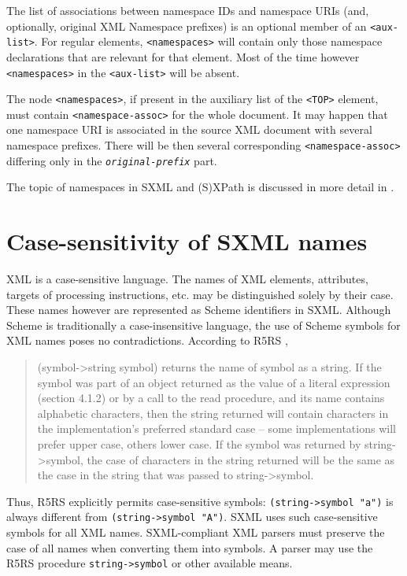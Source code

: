 \documentclass[10pt]{article}
\begin{document}
The list of associations between namespace IDs and namespace URIs (and, optionally, original XML Namespace prefixes) is an optional member of an \texttt{<aux-list>}. For regular elements, \texttt{<namespaces>} will contain only those namespace declarations that are relevant for that element. Most of the time however \texttt{<namespaces>} in the \texttt{<aux-list>} will be absent.

The node \texttt{<namespaces>}, if present in the auxiliary list of the \texttt{<TOP>} element, must contain \texttt{<namespace-assoc>} for the whole document. It may happen that one
namespace URI is associated in the source XML document with several
namespace prefixes. There will be then several corresponding \texttt{<namespace-assoc>} differing only in the \texttt{{\itshape original-prefix}} part.

The topic of namespaces in SXML and (S)XPath is discussed in
more detail in \cite{SXML-NS}.

\section{Case-sensitivity of SXML names}
XML is a case-sensitive language. The names of XML elements,
attributes, targets of processing instructions, etc. may be
distinguished solely by their case. These names however are
represented as Scheme identifiers in SXML. Although Scheme is
traditionally a case-insensitive language, the use of Scheme symbols
for XML names poses no contradictions. According to R5RS \cite{R5RS}, \begin{quote}
(symbol->string symbol) returns the name of symbol as a string. If
the symbol was part of an object returned as the value of a literal
expression (section 4.1.2) or by a call to the read procedure, and its
name contains alphabetic characters, then the string returned will
contain characters in the implementation's preferred standard
case -- some implementations will prefer upper case, others lower
case. If the symbol was returned by string->symbol, the case of
characters in the string returned will be the same as the case in the
string that was passed to string->symbol.\end{quote}


Thus, R5RS explicitly permits case-sensitive symbols: \texttt{(string->symbol "a")} is always different from \texttt{(string->symbol "A")}. SXML uses such case-sensitive symbols for
all XML names. SXML-compliant XML parsers must preserve the case of
all names when converting them into symbols. A parser may use the R5RS
procedure \texttt{string->symbol} or other available means.
\end{document}

